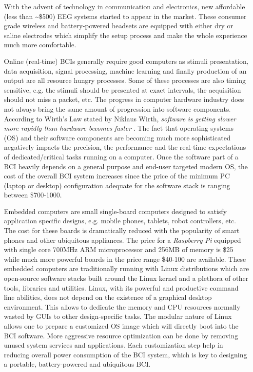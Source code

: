 \documentclass[12pt]{article}
\numberwithin{equation}{section}
\numberwithin{figure}{section}
\numberwithin{table}{section}
\begin{document}
\par{
    With the advent of technology in communication and electronics, new affordable (less than \textasciitilde\$500)
    EEG systems started to appear in the market. These consumer grade wireless and
    battery-powered headsets are equipped with either dry or saline
    electrodes which simplify the setup process and make the whole experience
    much more comfortable.
}
\par{
    Online (real-time) BCIs generally require good computers as
    stimuli presentation, data acquisition, signal processing, machine
    learning and finally production of an output are all resource hungry
    processes. Some of these processes are also timing sensitive, e.g.
    the stimuli should be presented at exact intervals, the acquisition
    should not miss a packet, etc.
    The progress in computer hardware industry does not always bring the
    same amount of progression into software components. According to Wirth's
    Law stated by Niklaus Wirth, \emph{software is getting slower more
    rapidly than hardware becomes faster} \citep{wirth_plea_1995}.
    The fact that operating systems (OS) and their software components are
    becoming much more sophisticated negatively impacts the precision, the performance
    and the real-time expectations of dedicated/critical tasks running on a computer.
    Once the software part of a BCI heavily depends on a general purpose and end-user targeted
    modern OS, the cost of the overall BCI system increases since the price of the minimum
    PC (laptop or desktop) configuration adequate for the software stack is ranging between
    \$700-1000.
}

\par{
    Embedded computers are small single-board computers designed to satisfy
    application specific designs, e.g. mobile phones, tablets, robot controllers, etc.
    The cost for these boards is dramatically reduced with the popularity of
    smart phones and other ubiquitous appliances. The price for a \emph{Raspberry Pi} equipped with
    single core 700MHz ARM microprocessor and 256MB of memory is \$25 while much more
    powerful boards in the price range \$40-100 are available.
    These embedded computers are traditionally running with Linux distributions
    which are open-source software stacks built around the Linux kernel
    and a plethora of other tools, libraries and utilities. Linux, with its
    powerful and productive command line abilities, does not depend on the
    existence of a graphical desktop environment. This allows to dedicate
    the memory and CPU resources normally wasted by GUIs to other design-specific
    tasks. The modular nature of Linux allows one to prepare a customized
    OS image which will directly boot into the BCI software. More aggressive resource
    optimization can be done by removing unused system services and applications.
    Each customization step help in reducing overall power consumption of the
    BCI system, which is key to designing a portable, battery-powered and ubiquitous
    BCI.
}
\end{document}
